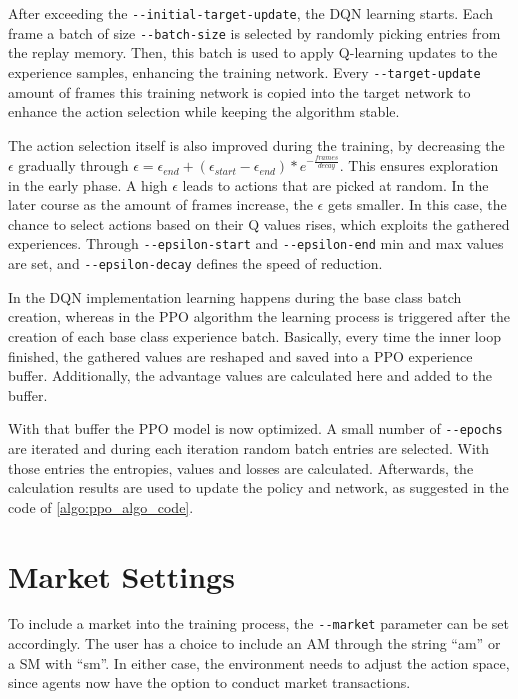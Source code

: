 After exceeding the \verb|--initial-target-update|, the DQN learning starts. Each frame a batch of size \verb|--batch-size| is selected by randomly picking entries from the replay memory. Then, this batch is used to apply Q-learning updates to the experience samples, enhancing the training network. Every \verb|--target-update| amount of frames this training network is copied into the target network to enhance the action selection while keeping the algorithm stable.

The action selection itself is also improved during the training, by decreasing the $\epsilon$ gradually through $\epsilon = \epsilon_{end}+(\epsilon_{start}-\epsilon_{end})*e^{-\frac{frames}{decay}}$. This ensures exploration in the early phase. A high $\epsilon$ leads to actions that are picked at random. In the later course as the amount of frames increase, the $\epsilon$ gets smaller. In this case, the chance to select actions based on their Q values rises, which exploits the gathered experiences. Through \verb|--epsilon-start| and \verb|--epsilon-end| min and max values are set, and \verb|--epsilon-decay| defines the speed of reduction.

In the DQN implementation learning happens during the base class batch creation, whereas in the PPO algorithm the learning process is triggered after the creation of each base class experience batch. Basically, every time the inner loop finished, the gathered values are reshaped and saved into a PPO experience buffer. Additionally, the advantage values are calculated here and added to the buffer.

With that buffer the PPO model is now optimized. A small number of \verb|--epochs| are iterated and during each iteration random batch entries are selected. With those entries the entropies, values and losses are calculated. Afterwards, the calculation results are used to update the policy and network, as suggested in the code of \ref{algo:ppo_algo_code}.

\section{Market Settings}\label{market_settings}
To include a market into the training process, the \verb|--market| parameter can be set accordingly. The user has a choice to include an AM through the string ``am'' or a SM with ``sm''. In either case, the environment needs to adjust the action space, since agents now have the option to conduct market transactions.

